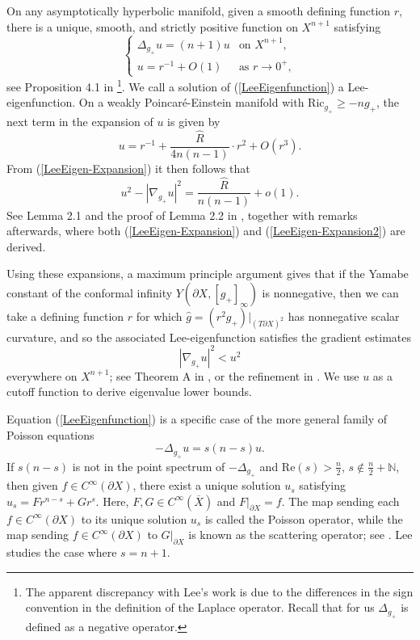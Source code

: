\documentclass{amsart}
\newcommand{\Ric}{\text{Ric}}
\begin{document}
On any asymptotically hyperbolic manifold, given a smooth defining function $r$, there is a unique, smooth, and strictly positive function on $X^{n+1}$ satisfying
\begin{equation}\label{LeeEigenfunction}
\begin{cases}
    \Delta_{g_+}u = (n+1)u &\text{on } X^{n+1},\\  u = r^{-1}+O(1) & \text{as } r\to0^+, 
\end{cases}
\end{equation}
see Proposition 4.1 in \cite{LeeJohnM.1995Tsoa}\footnote{The apparent discrepancy with Lee's work is due to the differences in the sign convention in the definition of the Laplace operator. Recall that for us $\Delta_{g_+}$ is defined as a negative operator.}. We call a solution of (\ref{LeeEigenfunction}) a Lee-eigenfunction. On a weakly Poincar\'e-Einstein manifold with $\Ric_{g_+}\ge -ng_+$, the next term in the expansion of $u$ is given by 
\begin{equation}\label{LeeEigen-Expansion}
u = r^{-1} + \frac{\hat R}{4n(n-1)}\cdot r^2 + O(r^3).
\end{equation}
From (\ref{LeeEigen-Expansion}) it then follows that 
\begin{equation}\label{LeeEigen-Expansion2}
    u^2 - |\nabla_{g_+}u|^2 = \frac{\hat R}{n(n-1)} + o(1).
\end{equation}
See Lemma 2.1 and the proof of Lemma 2.2 in \cite{GuillarmouColin2010SCoP}, together with remarks afterwards, where both (\ref{LeeEigen-Expansion}) and (\ref{LeeEigen-Expansion2}) are derived. 

Using these expansions, a maximum principle argument gives that if the Yamabe constant of the conformal infinity $Y(\partial X,[g_+]_\infty)$ is nonnegative, then we can take a defining function $r$ for which $\hat g = (r^2g_+)|_{(T\partial X)^2}$ has nonnegative scalar curvature, and so the associated Lee-eigenfunction satisfies the gradient estimates 
\begin{equation}\label{GradientEstimates}
    |\nabla_{g_+}u|^2<u^2
\end{equation}
everywhere on $X^{n+1}$; see Theorem A in \cite{LeeJohnM.1995Tsoa}, or the refinement in \cite{GuillarmouColin2010SCoP}. We use $u$ as a cutoff function to derive eigenvalue lower bounds.

\begin{remark}
    Equation (\ref{LeeEigenfunction}) is a specific case of the more general family of Poisson equations
    \[
    -\Delta_{g_+}u = s(n-s)u.
    \]
    If $s(n-s)$ is not in the point spectrum of $-\Delta_{g_+}$ and $\text{Re}(s)>\frac{n}{2}$, $s\not\in \frac{n}{2}+\mathbb{N}$, then given $f\in C^{\infty}(\partial X)$, there exist a unique solution $u_s$ satisfying $u_s = Fr^{n-s}+Gr^s$. Here, $F,G\in C^{\infty}(\overline X)$ and $F|_{\partial X} = f$. The map sending each $f\in C^{\infty}(\partial X)$ to its unique solution $u_s$ is called the Poisson operator, while the map sending $f\in C^{\infty}(\partial X)$ to $G|_{\partial X}$ is known as the scattering operator; see \cites{Graham-Zworski, CaseJeffreyS.2016OFGO}. Lee studies the case where $s=n+1$.
\end{remark}
\end{document}
